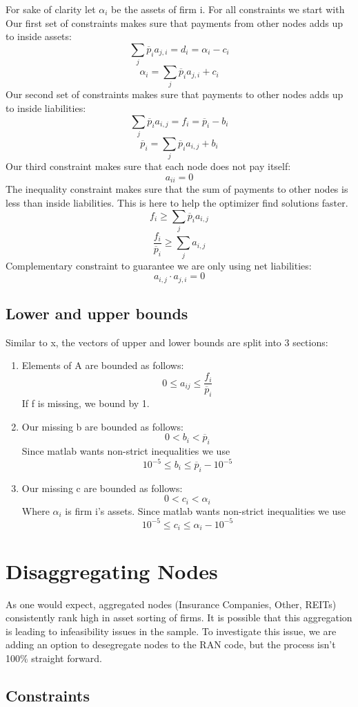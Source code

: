 \documentclass{article}
\newcommand{\?}{\stackrel{?}{=}}
\newcommand{\pbar}{\overline{p}}
\begin{document}
For sake of clarity let $\alpha_i$ be the assets of firm i. For all constraints we start with 
\noindent Our first set of constraints makes sure that payments from other nodes adds up to inside assets:
$$\sum_j \pbar_i a_{j,i}=d_i=\alpha_i-c_i$$
$$\alpha_i=\sum_j \pbar_i a_{j,i} + c_i$$
Our second set of constraints makes sure that payments to other nodes adds up to inside liabilities:
$$\sum_j \pbar_i a_{i,j}=f_i=\pbar_i-b_i$$
$$\pbar_i=\sum_j \pbar_i a_{i,j}+b_i$$
Our third constraint makes sure that each node does not pay itself:
$$a_{ii}=0$$
The inequality constraint makes sure that the sum of payments to other nodes is less than inside liabilities. This is here to help the optimizer find solutions faster. 
$$f_i\geq \sum_j \pbar_i a_{i,j}$$
$$\frac{f_i}{\pbar_i} \geq \sum_j a_{i,j}$$
Complementary constraint to guarantee we are only using net liabilities:
$$a_{i,j}\cdot a_{j,i}=0$$

\subsection{Lower and upper bounds}
Similar to x, the vectors of upper and lower bounds are split into 3 sections:
\begin{enumerate}
\item Elements of A are bounded as follows:
$$0\leq a_{ij}\leq \frac{f_i}{\pbar_i}$$
If f is missing, we bound by 1. 
\item Our missing b are bounded as follows:
$$0<b_i<\pbar_i$$
Since matlab wants non-strict inequalities we use
$$10^{-5}\leq b_i\leq\pbar_i-10^{-5}$$
\item Our missing c are bounded as follows:
$$0<c_i<\alpha_i$$
Where $\alpha_i$ is firm i's assets. Since matlab wants non-strict inequalities we use
$$10^{-5}\leq c_i\leq\alpha_i-10^{-5}$$
\end{enumerate}

\section{Disaggregating Nodes}
As one would expect, aggregated nodes (Insurance Companies, Other, REITs) consistently rank high in asset sorting of firms. It is possible that this aggregation is leading to infeasibility issues in the sample. To investigate this issue, we are adding an option to desegregate nodes to the RAN code, but the process isn't 100$\%$ straight forward.

\subsection{Constraints}
\end{document}
